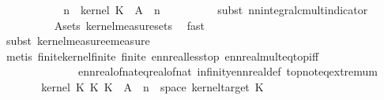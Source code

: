 \begin{isabellebody}
\ \ \ \ \ \ \isamarkupfalse%
\ \isamarkupfalse%
\ {\isachardoublequoteopen}{\isachardot}{\kern0pt}{\isachardot}{\kern0pt}{\isachardot}{\kern0pt}\ {\isasymle}\ n\ {\isacharasterisk}{\kern0pt}\ kernel\ K{\isacharunderscore}{\kern0pt}{}\ {\isasymomega}\ {\isacharparenleft}{\kern0pt}A\ {\isasymomega}\ n{\isacharparenright}{\kern0pt}{\isachardoublequoteclose}\isanewline
\ \ \ \ \ \ \ \ \isamarkupfalse%
\ {\isacharparenleft}{\kern0pt}subst\ nn{\isacharunderscore}{\kern0pt}integral{\isacharunderscore}{\kern0pt}cmult{\isacharunderscore}{\kern0pt}indicator{\isacharparenright}{\kern0pt}\isanewline
\ \ \ \ \ \ \ \ \isamarkupfalse%
\ A{\isacharunderscore}{\kern0pt}sets\ kernel{\isacharunderscore}{\kern0pt}measure{\isacharunderscore}{\kern0pt}sets\ \isamarkupfalse%
\ fast\isanewline
\ \ \ \ \ \ \ \ \isamarkupfalse%
\ {\isacharparenleft}{\kern0pt}subst\ kernel{\isacharunderscore}{\kern0pt}measure{\isacharunderscore}{\kern0pt}emeasure{\isacharparenright}{\kern0pt}\ \isacommand{{\isachardot}{\kern0pt}{\isachardot}{\kern0pt}}\isamarkupfalse%
\isanewline
\ \ \ \ \ \ \isamarkupfalse%
\ \isamarkupfalse%
\ {\isachardoublequoteopen}{\isachardot}{\kern0pt}{\isachardot}{\kern0pt}{\isachardot}{\kern0pt}\ {\isacharless}{\kern0pt}\ {\isasyminfinity}{\isachardoublequoteclose}\isanewline
\ \ \ \ \ \ \isamarkupfalse%
\ {\isacharparenleft}{\kern0pt}metis\ finite{\isacharunderscore}{\kern0pt}kernel{\isacharunderscore}{\kern0pt}finite\ finite{\isacharparenleft}{\kern0pt}{}{\isacharparenright}{\kern0pt}\ ennreal{\isacharunderscore}{\kern0pt}less{\isacharunderscore}{\kern0pt}top\ ennreal{\isacharunderscore}{\kern0pt}mult{\isacharunderscore}{\kern0pt}eq{\isacharunderscore}{\kern0pt}top{\isacharunderscore}{\kern0pt}iff\ \isanewline
\ \ \ \ \ \ \ \ \ \ \ \ \ \ ennreal{\isacharunderscore}{\kern0pt}of{\isacharunderscore}{\kern0pt}nat{\isacharunderscore}{\kern0pt}eq{\isacharunderscore}{\kern0pt}real{\isacharunderscore}{\kern0pt}of{\isacharunderscore}{\kern0pt}nat\ infinity{\isacharunderscore}{\kern0pt}ennreal{\isacharunderscore}{\kern0pt}def\ top{\isachardot}{\kern0pt}not{\isacharunderscore}{\kern0pt}eq{\isacharunderscore}{\kern0pt}extremum{\isacharparenright}{\kern0pt}\isanewline
\ \ \ \ \isamarkupfalse%
\ \isamarkupfalse%
\ {\isachardoublequoteopen}kernel\ {\isacharparenleft}{\kern0pt}K{\isacharunderscore}{\kern0pt}{}\ {\isasymOtimes}\isactrlsub K\ K{\isacharunderscore}{\kern0pt}{}{\isacharparenright}{\kern0pt}\ {\isasymomega}\ {\isacharparenleft}{\kern0pt}A\ {\isasymomega}\ n\ {\isasymtimes}\ space\ {\isacharparenleft}{\kern0pt}kernel{\isacharunderscore}{\kern0pt}target\ K{\isacharunderscore}{\kern0pt}{}{\isacharparenright}{\kern0pt}{\isacharparenright}{\kern0pt}\ {\isacharless}{\kern0pt}\ {\isasyminfinity}{\isachardoublequoteclose}\isanewline

\end{isabellebody}
